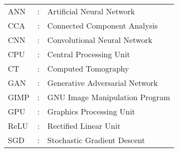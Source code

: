 \begin{tabular}{lcl}
ANN                 &:     & Artificial Neural Network \\
CCA                 &:     & Connected Component Analysis \\
CNN                 &:     & Convolutional Neural Network \\
CPU                 &:     & Central Processing Unit \\
CT                  &:     & Computed Tomography \\
GAN                 &:     & Generative Adversarial Network \\
GIMP                &:     & GNU Image Manipulation Program \\
GPU                 &:     & Graphics Processing Unit \\
ReLU                &:     & Rectified Linear Unit \\
SGD                 &:     & Stochastic Gradient Descent \\
\end{tabular}